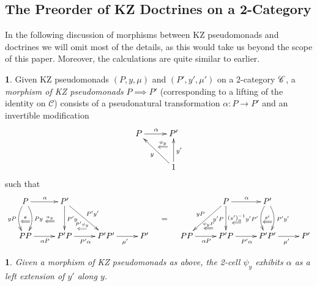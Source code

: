 \documentclass[a4paper,oneside,english]{amsart}
\numberwithin{equation}{section}
\numberwithin{figure}{section}
\theoremstyle{plain}
\theoremstyle{definition}
\newtheorem{defn}[thm]{\protect\definitionname}
\theoremstyle{remark}
\theoremstyle{definition}
\theoremstyle{plain}
\theoremstyle{plain}
\theoremstyle{plain}
\newtheorem{lem}[thm]{\protect\lemmaname}
\providecommand{\definitionname}{Definition}
\providecommand{\lemmaname}{Lemma}
\begin{document}
\subsection{The Preorder of KZ Doctrines on a 2-Category}

In the following discussion of morphisms between KZ pseudomonads and
doctrines we will omit most of the details, as this would take us
beyond the scope of this paper. Moreover, the calculations are quite
similar to earlier. 
\begin{defn}
Given KZ pseudomonads $\left(P,y,\mu\right)$ and $\left(P',y',\mu'\right)$
on a 2-category $\mbox{\ensuremath{\mathscr{C}}}$, a \emph{morphism
of KZ pseudomonads} $P\implies P'$ (corresponding to a lifting of
the identity on $\mathscr{C}$) consists of a pseudonatural transformation
$\alpha\colon P\to P'$ and an invertible modification 
\[
\xymatrix@=1em{P\ar[rr]^{\alpha} &  & P'\\
 & \ar@{}[ur]|-{\overset{\psi_{y}}{\Longleftarrow}}\\
 &  & 1\ar[uu]_{y'}\ar[lluu]^{y}
}
\]
such that 
\[
\xymatrix@=1em{P\ar[rr]^{\alpha}\ar@/^{0.7pc}/[dd]^{Py}\ar@/_{0.7pc}/[dd]_{yP} &  & P'\ar[dd]^{P'y}\ar[rrdd]^{P'y'} &  &  &  &  &  &  &  & P\ar[rr]^{\alpha}\ar[dd]_{y'P}\ar[dlld]_{yP} &  & P'\ar@/^{0.7pc}/[dd]^{P'y'}\ar@/_{0.7pc}/[dd]_{y'P'}\\
\ar@{}[]|-{\stackrel{\theta}{\Longleftarrow}} & \ar@{}[r]|-{\stackrel{\alpha_{y}}{\Longleftarrow}\quad} & \; & \ar@{}[ld]|-{\;\quad\stackrel{P'\psi_{y}}{\Longleftarrow}} &  &  &  & = &  & \ar@{}[rd]|-{\stackrel{\psi_{y}P}{\Longleftarrow}\quad\;} & \; & \ar@{}[l]|-{\stackrel{\left(y'\right)_{\alpha}^{-1}}{\Longleftarrow}} & \ar@{}[]|-{\stackrel{\theta'}{\Longleftarrow}}\\
PP\ar[rr]_{\alpha P} &  & P'P\ar[rr]_{P'\alpha} &  & P'P'\ar[rr]_{\mu'} &  & P' &  & PP\ar[rr]_{\alpha P} &  & P'P\ar[rr]_{P'\alpha} &  & P'P'\ar[rr]_{\mu'} &  & P'
}
\]
\end{defn}
\begin{lem}
Given a morphism of KZ pseudomonads as above, the 2-cell $\psi_{y}$
exhibits $\alpha$ as a left extension of $y'$ along $y$.\end{lem}
\end{document}
